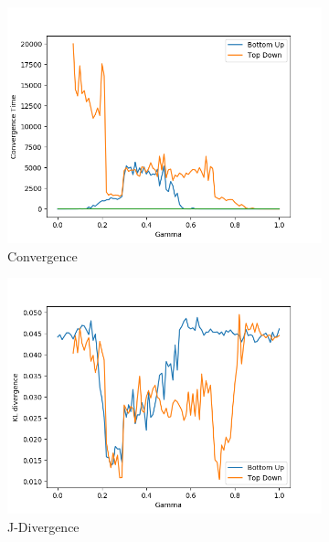 \begin{figure}[H]
 \centering
  \begin{subfigure}[ht]{0.45\textwidth}
    \includegraphics[width=\textwidth]{Images/Figures/All/FIE_alpha_0,3_p_100_n_3_runs_20.png}
    \caption{Convergence}
 \end{subfigure}
 \hfill
 \begin{subfigure}[ht]{0.45\textwidth}
    \includegraphics[width=\textwidth]{Images/Figures/All/J_div_FIE_ALL_n_3_p_100_gamm_0,5_alpha_0,5.png}
    \caption{J-Divergence}
 \end{subfigure}
 \hfill
 \begin{subfigure}[ht]{0.45\textwidth}

\end{subfigure}
\end{figure}
